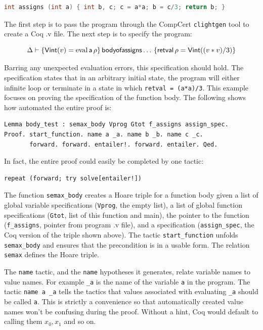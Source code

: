 \documentclass{puthesis}
\begin{document}
\begin{lstlisting}[language=c]
int assigns (int a) { int b, c; c = a*a; b = c/3; return b; }
\end{lstlisting}

The first step is to pass the program through the CompCert
\lstinline|clightgen| tool to create a Coq .v file. The next step is
to specify the program:

\[\Delta \vdash \{\mathsf{Vint}(v)=\mathrm{eval}\,\mathsf{a}\,\rho\}\,\mathsf{body of assigns}\ldots\,\{\mathsf{retval}\,\rho = \mathsf{Vint}((v * v) /
3)\}\]

Barring any unexpected evaluation errors, this specification should hold.
The specification states that in an arbitrary initial state, the program will either
infinite loop or terminate in a state in which \lstinline|retval = (a*a)/3|. This
example focuses on proving the specification of the function
body. The following shows
how automated the entire proof is:

\begin{lstlisting}
Lemma body_test : semax_body Vprog Gtot f_assigns assign_spec.
Proof. start_function. name a _a. name b _b. name c _c.
       forward. forward. entailer!. forward. entailer. Qed.
\end{lstlisting}

In fact, the entire proof could easily be completed by one tactic:

\begin{lstlisting}
repeat (forward; try solve[entailer!])
\end{lstlisting}

The function \lstinline|semax_body| creates a Hoare triple for a function body given a
list of global variable specifications (\lstinline|Vprog|, the empty list), a
list of global function specifications (\lstinline|Gtot|, list of this function and
main), the pointer to the function (\lstinline|f_assigns|, pointer from
program .v file), and a specification (\lstinline|assign_spec|, the Coq version
of the triple shown above). The tactic \lstinline|start_function| unfolds
\lstinline|semax_body| and ensures that the precondition is in a usable form.
The relation \lstinline|semax| defines the Hoare triple.

The \lstinline|name| tactic, and the \lstinline|name| hypotheses it
generates, relate variable names to value names. For example
\lstinline|_a| is the name of the variable \lstinline|a| in the
program. The tactic \lstinline|name a _a| tells the tactics that
values associated with evaluating \lstinline|_a| should be called
\lstinline|a|. This is strictly a convenience so that automatically
created value names won't be confusing during the proof. Without a
hint, Coq would default to calling them $x_0, x_1$ and so on. 
\end{document}
